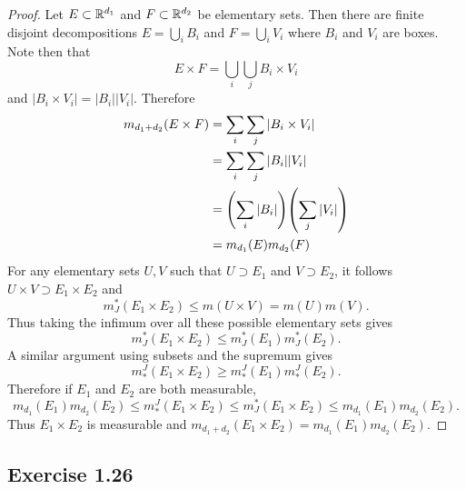 \documentclass[hw_all.tex]{subfiles}
\begin{document}
\begin{proof}
    Let $E \subset \mathbb{R}^{d_1}$ and $F \subset \mathbb{R}^{d_2}$ be elementary sets. Then there are finite disjoint decompositions $E = \bigcup_{i} B_i$ and $F = \bigcup_i V_i$ where $B_i$ and $V_i$ are boxes. Note then that
    \[
        E \times F = \bigcup_{i} \bigcup_{j} B_i \times V_i
    \]
    and $|B_i \times V_i| = |B_i| |V_i|$. Therefore
    \begin{align*}
        m_{d_1 + d_2}(E \times F) &= \sum_{i} \sum_{j} |B_i \times V_i| \\
        &= \sum_{i} \sum_{j} |B_i| |V_i| \\
        &= \qty(\sum_{i} |B_i|) \qty(\sum_j |V_i|) \\
        &= m_{d_1}(E) m_{d_2}(F)
    \end{align*}
    For any elementary sets $U, V$ such that $U \supset E_1$ and $V \supset E_2$, it follows $U \times V \supset E_1 \times E_2$ and
    \[
        m_J^*(E_1 \times E_2) \leq m(U \times V) = m(U) m(V)
    .\]
    Thus taking the infimum over all these possible elementary sets gives
    \[
        m_J^*(E_1 \times E_2) \leq m_J^*(E_1) m_J^*(E_2)
    .\]
    A similar argument using subsets and the supremum gives
    \[
        m^J_*(E_1 \times E_2) \geq m^J_*(E_1) m^J_*(E_2)
    .\]
    Therefore if $E_1$ and $E_2$ are both measurable,
    \[
        m_{d_1}(E_1) m_{d_2}(E_2) \leq m^J_*(E_1 \times E_2) \leq m_J^*(E_1 \times E_2) \leq m_{d_1}(E_1) m_{d_2}(E_2)
    .\]
    Thus $E_1 \times E_2$ is measurable and $m_{d_1 + d_2}(E_1 \times E_2) = m_{d_1}(E_1) m_{d_2}(E_2)$.
\end{proof}

\subsection{Exercise 1.26}
\end{document}
